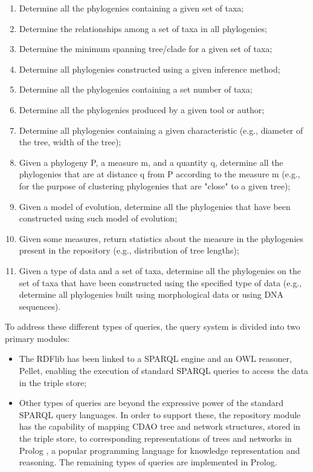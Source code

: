 \documentclass[10pt]{article}
\begin{document}
\begin{enumerate}
\item Determine all the phylogenies containing a given set of taxa;
\item Determine the relationships among a set of taxa in all phylogenies;
\item Determine the minimum spanning tree/clade for a given set of taxa;
\item Determine all phylogenies constructed using a given inference method;
\item Determine all the phylogenies containing a set number of taxa;
\item Determine all the phylogenies produced by a given tool or author;
\item Determine all phylogenies containing a given characteristic (e.g.,
diameter of the tree, width of the tree);
\item Given a phylogeny P, a measure m, and a quantity q, determine all the
phylogenies that are at distance q from P according to the measure m (e.g., for
the purpose of clustering phylogenies that are "close" to a given tree);
\item Given a model of evolution, determine all the phylogenies that have been
constructed using such model of evolution;
\item Given some measures, return statistics about the measure in the
phylogenies present in the repository (e.g., distribution of tree lengths);
\item Given a type of data and a set of taxa, determine all the phylogenies on
the set of taxa that have been constructed using the specified type of data
(e.g., determine all phylogenies built using morphological data or using DNA
sequences).
\end{enumerate}
To address these different types of queries, the query system is divided into two primary modules:
\begin{itemize}
\item The RDFlib has been linked to a SPARQL \cite{sparql} engine and an OWL reasoner,
Pellet, enabling the execution of standard SPARQL queries to access the data
in the triple store;
\item Other types of queries are beyond the expressive power of the standard
SPARQL query languages. In order to support these, the repository module has
the capability of mapping CDAO tree and network structures, stored in the
triple store, to corresponding representations of trees and networks in Prolog
\cite{prolog}, a popular programming language for knowledge representation and
reasoning. The remaining types of queries are implemented in Prolog.
\end{itemize}
\end{document}
